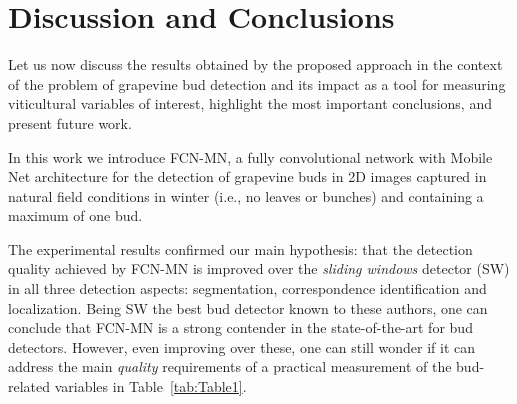 \documentclass[a4paper,authoryear,review]{elsarticle}
\begin{document}
	
	\section{Discussion and Conclusions}
	\label{sec:discussion}
	
	Let us now discuss the results obtained by the proposed approach in the context of the problem of grapevine bud detection and its impact as a tool for measuring viticultural variables of interest, highlight the most important conclusions, and present future work. 
	
	In this work we introduce FCN-MN, a fully convolutional network with Mobile Net architecture for the detection of grapevine buds in 2D images captured in natural field conditions in winter (i.e., no leaves or bunches) and containing a maximum of one bud.
	
	The experimental results confirmed our main hypothesis: that the detection quality achieved by FCN-MN is improved over the \emph{sliding windows} detector (SW) in all three detection aspects: segmentation, correspondence identification and localization. Being SW the best bud detector known to these authors, one can conclude that FCN-MN is a strong contender in the state-of-the-art for bud detectors. However, even improving over these, one can still wonder if it can address the main \emph{quality} requirements of a practical measurement of the bud-related variables in Table~\ref{tab:Table1}.
	
\end{document}
